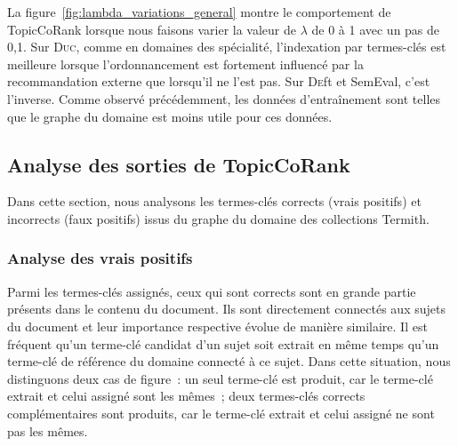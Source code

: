         La figure~\ref{fig:lambda_variations_general} montre le comportement de
        TopicCoRank lorsque nous faisons varier la valeur de $\lambda$ de 0 à 1
        avec un pas de 0,1. Sur \textsc{Duc}, comme en domaines des spécialité,
        l'indexation par termes-clés est meilleure lorsque l'ordonnancement est
        fortement influencé par la recommandation externe que lorsqu'il ne l'est
        pas. Sur \textsc{De}ft et SemEval, c'est l'inverse. Comme observé précédemment, les données
        d'entraînement sont telles que le graphe du domaine est moins utile pour
        ces données.
        

    \subsection{Analyse des sorties de TopicCoRank}
    \label{subsec:main-domain_specific_keyphrase_annotation-supervised_automatic_keyphrase_annotation-error_analysis}
      Dans cette section, nous analysons les termes-clés corrects (vrais
      positifs) et incorrects (faux positifs) issus du graphe du domaine des
      collections Termith.

      \subsubsection{Analyse des vrais positifs}
      \label{subsec:main-domain_specific_keyphrase_annotation-supervised_automatic_keyphrase_annotation-error_analysis-true_positives}
        Parmi les termes-clés assignés, ceux qui sont corrects sont en grande
        partie présents dans le contenu du document. Ils sont directement
        connectés aux sujets du document et leur importance respective évolue de
        manière similaire. Il est fréquent qu'un terme-clé candidat d'un sujet
        soit extrait en même temps qu'un terme-clé de référence du domaine
        connecté à ce sujet. Dans cette situation, nous distinguons deux cas de
        figure~: un seul terme-clé est produit, car le terme-clé extrait et
        celui assigné sont les mêmes~; deux termes-clés corrects complémentaires
        sont produits, car le terme-clé extrait et celui assigné ne sont pas les
        mêmes.
        
